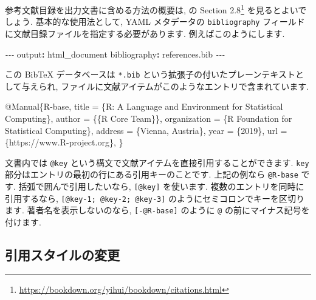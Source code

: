 \documentclass[
  11pt,
  lualatex,ja=standard,jafont=noto]{bxjsreport}
\newenvironment{Shaded}{\begin{snugshade}}{\end{snugshade}}
\newcommand{\AttributeTok}[1]{\textcolor[rgb]{0.77,0.63,0.00}{#1}}
\newcommand{\DataTypeTok}[1]{\textcolor[rgb]{0.13,0.29,0.53}{#1}}
\newcommand{\FunctionTok}[1]{\textcolor[rgb]{0.00,0.00,0.00}{#1}}
\newcommand{\KeywordTok}[1]{\textcolor[rgb]{0.13,0.29,0.53}{\textbf{#1}}}
\newcommand{\NormalTok}[1]{#1}
\newcommand{\OtherTok}[1]{\textcolor[rgb]{0.56,0.35,0.01}{#1}}
\newcommand{\PreprocessorTok}[1]{\textcolor[rgb]{0.56,0.35,0.01}{\textit{#1}}}
\newcommand{\VariableTok}[1]{\textcolor[rgb]{0.00,0.00,0.00}{#1}}
\renewcommand{\href}[2]{#2\footnote{\url{#1}}}
\begin{document}
参考文献目録を出力文書に含める方法の概要は, \textcite{bookdown2016} の \href{https://bookdown.org/yihui/bookdown/citations.html}{Section 2.8} を見るとよいでしょう. 基本的な使用法として, YAML メタデータの \texttt{bibliography} フィールドに文献目録ファイルを指定する必要があります. 例えばこのようにします.

\begin{Shaded}
\begin{Highlighting}[]
\PreprocessorTok{{-}{-}{-}}
\FunctionTok{output}\KeywordTok{:}\AttributeTok{ html\_document}
\FunctionTok{bibliography}\KeywordTok{:}\AttributeTok{ references.bib }
\PreprocessorTok{{-}{-}{-}}
\end{Highlighting}
\end{Shaded}

この BibTeX データベースは \texttt{*.bib} という拡張子の付いたプレーンテキストとして与えられ, ファイルに文献アイテムがこのようなエントリで含まれています.

\begin{Shaded}
\begin{Highlighting}[]
\VariableTok{@Manual}\NormalTok{\{}\OtherTok{R}\NormalTok{{-}}\OtherTok{base}\NormalTok{,}
  \DataTypeTok{title}\NormalTok{ = \{R: A Language and Environment for Statistical}
\NormalTok{           Computing\},}
  \DataTypeTok{author}\NormalTok{ = \{\{R Core Team\}\},}
  \DataTypeTok{organization}\NormalTok{ = \{R Foundation for Statistical Computing\},}
  \DataTypeTok{address}\NormalTok{ = \{Vienna, Austria\},}
  \DataTypeTok{year}\NormalTok{ = \{2019\},}
  \DataTypeTok{url}\NormalTok{ = \{https://www.R{-}project.org\},}
\NormalTok{\}}
\end{Highlighting}
\end{Shaded}

文書内では \texttt{@key} という構文で文献アイテムを直接引用することができます. \texttt{key} 部分はエントリの最初の行にある引用キーのことです. 上記の例なら \texttt{@R-base} です. 括弧で囲んで引用したいなら, \texttt{{[}@key{]}} を使います. 複数のエントリを同時に引用するなら, \texttt{{[}@key-1;\ @key-2;\ @key-3{]}} のようにセミコロンでキーを区切ります. 著者名を表示しないのなら, \texttt{{[}-@R-base{]}} のように \texttt{@} の前にマイナス記号を付けます.

\hypertarget{changing-citation-style}{%
\subsection{引用スタイルの変更}\label{changing-citation-style}}
\end{document}
